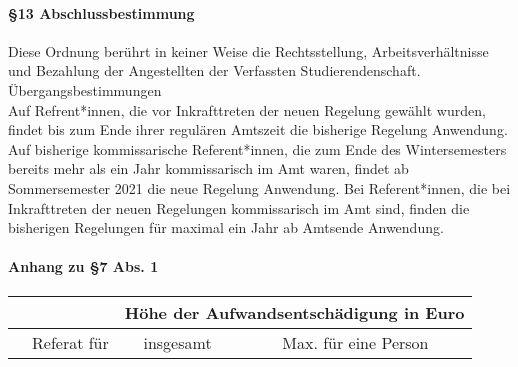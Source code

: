         \paragraph{§13 Abschlussbestimmung}
            Diese Ordnung berührt in keiner Weise die Rechtsstellung, Arbeitsverhältnisse und Bezahlung der Angestellten der Verfassten Studierendenschaft.\\
            Übergangsbestimmungen\\
            Auf Refrent*innen, die vor Inkrafttreten der neuen Regelung gewählt wurden, findet bis zum Ende ihrer regulären Amtszeit die bisherige Regelung Anwendung. \\
            Auf bisherige kommissarische Referent*innen, die zum Ende des Wintersemesters bereits mehr als ein Jahr kommissarisch im Amt waren, findet ab Sommersemester 2021 die neue Regelung Anwendung. Bei Referent*innen, die bei Inkrafttreten der neuen Regelungen kommissarisch im Amt sind, finden die bisherigen Regelungen für maximal ein Jahr ab Amtsende Anwendung.
        \paragraph{Anhang zu §7 Abs. 1}
            \begin{tabular}{|l|l|c|c}
                \hline
                &&\multicolumn{2}{|c|}{Höhe der Aufwandsentschädigung in Euro}\\\hline
                &Referat für & insgesamt & Max. für eine Person \\\hline\hline
            \end{tabular}